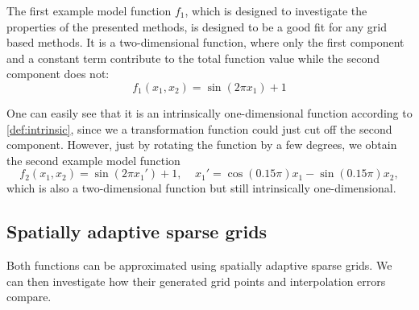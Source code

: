 \documentclass[
  a4paper,  %
  twoside,  %
  bibliography=totoc,
  headsepline,
  cleardoublepage=empty,
  parskip=half,
  draft=false
]{scrbook}
\begin{document}
The first example model function $f_1$, which is designed to investigate the properties of the presented methods, is designed to be a good fit for any grid based methods.
It is a two-dimensional function, where only the first component and a constant term contribute to the total function value while the second component does not:
\begin{equation}
f_1(x_1, x_2)=\sin(2 \pi x_1) + 1
\nonumber
\end{equation}

One can easily see that it is an intrinsically one-dimensional function according to \cref{def:intrinsic}, since we a transformation function could just cut off the second component.
However, just by rotating the function by a few degrees, we obtain the second example model function
\begin{equation}
f_2(x_1,x_2)=\sin(2 \pi x_1') + 1, ~~~~~ x_1'=\cos(0.15 \pi) x_1 -\sin(0.15 \pi) x_2,
\end{equation}
which is also a two-dimensional function but still intrinsically one-dimensional.

\subsection{Spatially adaptive sparse grids}

Both functions can be approximated using spatially adaptive sparse grids.
We can then investigate how their generated grid points and interpolation errors compare.
\end{document}
